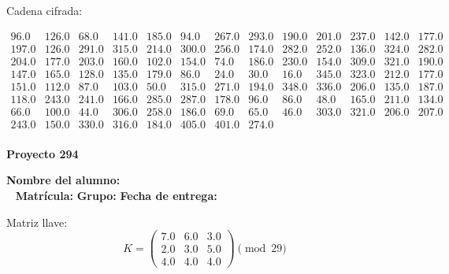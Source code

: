\documentclass[12pt]{article}
\begin{document}
Cadena cifrada:
\begin{center}
$\begin{array}{lllllllllllll}
96.0 & 126.0 & 68.0 & 141.0 & 185.0 & 94.0 & 267.0 & 293.0 & 190.0 & 201.0 & 237.0 & 142.0 & 177.0\\
197.0 & 126.0 & 291.0 & 315.0 & 214.0 & 300.0 & 256.0 & 174.0 & 282.0 & 252.0 & 136.0 & 324.0 & 282.0\\
204.0 & 177.0 & 203.0 & 160.0 & 102.0 & 154.0 & 74.0 & 186.0 & 230.0 & 154.0 & 309.0 & 321.0 & 190.0\\
147.0 & 165.0 & 128.0 & 135.0 & 179.0 & 86.0 & 24.0 & 30.0 & 16.0 & 345.0 & 323.0 & 212.0 & 177.0\\
151.0 & 112.0 & 87.0 & 103.0 & 50.0 & 315.0 & 271.0 & 194.0 & 348.0 & 336.0 & 206.0 & 135.0 & 187.0\\
118.0 & 243.0 & 241.0 & 166.0 & 285.0 & 287.0 & 178.0 & 96.0 & 86.0 & 48.0 & 165.0 & 211.0 & 134.0\\
66.0 & 100.0 & 44.0 & 306.0 & 258.0 & 186.0 & 69.0 & 65.0 & 46.0 & 303.0 & 321.0 & 206.0 & 207.0\\
243.0 & 150.0 & 330.0 & 316.0 & 184.0 & 405.0 & 401.0 & 274.0\\
\end{array}$
\end{center}

\newpage


\textbf{Proyecto 294}

\textbf{Nombre del alumno:} \underline{\hspace{13cm}}\\\
\vspace{1cm}
\textbf{Matrícula:} \underline{\hspace{4cm}} \hspace{1cm}
\textbf{Grupo:} \underline{\hspace{2cm}}
\textbf{Fecha de entrega:} \underline{\hspace{2cm}}

\medskip

Matriz llave:
\[
K = \begin{pmatrix}
7.0 & 6.0 & 3.0\\
2.0 & 3.0 & 5.0\\
4.0 & 4.0 & 4.0
\end{pmatrix} \pmod{29}
\]
\end{document}
